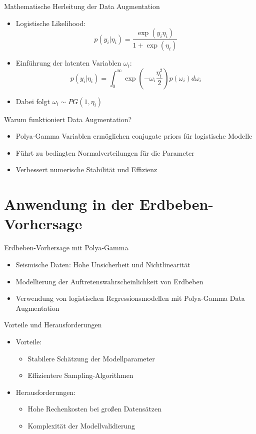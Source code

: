 \documentclass{beamer}
\begin{document}
\begin{frame}{Mathematische Herleitung der Data Augmentation}
  \begin{itemize}
    \item Logistische Likelihood:
    \[ p(y_i | \eta_i) = \frac{\exp(y_i \eta_i)}{1+\exp(\eta_i)} \]
    \item Einführung der latenten Variablen $\omega_i$:
    \[ p(y_i | \eta_i) = \int_0^\infty \exp\left(-\omega_i \frac{\eta_i^2}{2}\right) p(\omega_i) d\omega_i \]
    \item Dabei folgt $\omega_i \sim PG(1, \eta_i)$
  \end{itemize}
\end{frame}

\begin{frame}{Warum funktioniert Data Augmentation?}
  \begin{itemize}
    \item Polya-Gamma Variablen ermöglichen conjugate priors für logistische Modelle
    \item Führt zu bedingten Normalverteilungen für die Parameter
    \item Verbessert numerische Stabilität und Effizienz
  \end{itemize}
\end{frame}

\section{Anwendung in der Erdbeben-Vorhersage}
\begin{frame}{Erdbeben-Vorhersage mit Polya-Gamma}
  \begin{itemize}
    \item Seismische Daten: Hohe Unsicherheit und Nichtlinearität
    \item Modellierung der Auftretenswahrscheinlichkeit von Erdbeben
    \item Verwendung von logistischen Regressionsmodellen mit Polya-Gamma Data Augmentation
  \end{itemize}
\end{frame}

\begin{frame}{Vorteile und Herausforderungen}
  \begin{itemize}
    \item Vorteile:
    \begin{itemize}
      \item Stabilere Schätzung der Modellparameter
      \item Effizientere Sampling-Algorithmen
    \end{itemize}
    \item Herausforderungen:
    \begin{itemize}
      \item Hohe Rechenkosten bei großen Datensätzen
      \item Komplexität der Modellvalidierung
    \end{itemize}
  \end{itemize}
\end{frame}
\end{document}
